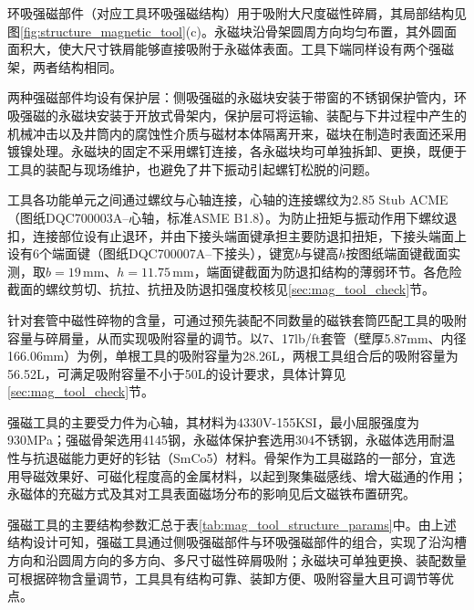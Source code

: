环吸强磁部件（对应工具环吸强磁结构）用于吸附大尺度磁性碎屑，其局部结构见图\ref{fig:structure_magnetic_tool}(c)。永磁块沿骨架圆周方向均匀布置，其外圆面面积大，使大尺寸铁屑能够直接吸附于永磁体表面。工具下端同样设有两个强磁架，两者结构相同。

两种强磁部件均设有保护层：侧吸强磁的永磁块安装于带窗的不锈钢保护管内，环吸强磁的永磁块安装于开放式骨架内，保护层可将运输、装配与下井过程中产生的机械冲击以及井筒内的腐蚀性介质与磁材本体隔离开来，磁块在制造时表面还采用镀镍处理。永磁块的固定不采用螺钉连接，各永磁块均可单独拆卸、更换，既便于工具的装配与现场维护，也避免了井下振动引起螺钉松脱的问题。

工具各功能单元之间通过螺纹与心轴连接，心轴的连接螺纹为2.85 Stub ACME（图纸DQC700003A--心轴，标准ASME B1.8）。为防止扭矩与振动作用下螺纹退扣，连接部位设有止退环，并由下接头端面键承担主要防退扣扭矩，下接头端面上设有6个端面键（图纸DQC700007A--下接头），键宽$b$与键高$h$按图纸端面键截面实测，取$b=19\,\text{mm}$、$h=11.75\,\text{mm}$，端面键截面为防退扣结构的薄弱环节。各危险截面的螺纹剪切、抗拉、抗扭及防退扣强度校核见\ref{sec:mag_tool_check}节。

针对套管中磁性碎物的含量，可通过预先装配不同数量的磁铁套筒匹配工具的吸附容量与碎屑量，从而实现吸附容量的调节。以7\inch、17lb/ft套管（壁厚5.87mm、内径166.06mm）为例，单根工具的吸附容量为28.26L，两根工具组合后的吸附容量为56.52L，可满足吸附容量不小于50L的设计要求，具体计算见\ref{sec:mag_tool_check}节。

强磁工具的主要受力件为心轴，其材料为4330V-155KSI，最小屈服强度为930MPa；强磁骨架选用4145钢，永磁体保护套选用304不锈钢，永磁体选用耐温性与抗退磁能力更好的钐钴（SmCo5）材料。骨架作为工具磁路的一部分，宜选用导磁效果好、可磁化程度高的金属材料，以起到聚集磁感线、增大磁通的作用；永磁体的充磁方式及其对工具表面磁场分布的影响见后文磁铁布置研究。

强磁工具的主要结构参数汇总于表\ref{tab:mag_tool_structure_params}中。由上述结构设计可知，强磁工具通过侧吸强磁部件与环吸强磁部件的组合，实现了沿沟槽方向和沿圆周方向的多方向、多尺寸磁性碎屑吸附；永磁块可单独更换、装配数量可根据碎物含量调节，工具具有结构可靠、装卸方便、吸附容量大且可调节等优点。

